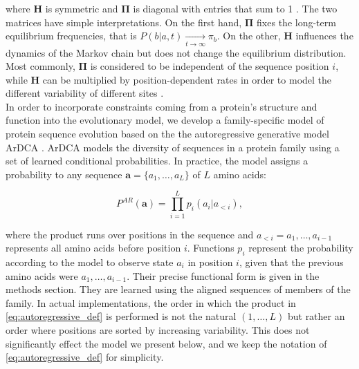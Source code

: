 where $\mathbf{H}$ is symmetric and $\mathbf{\Pi}$ is diagonal with entries that sum to 1 \cite{yang_computationalmolecularevolution_2006}. 
The two matrices have simple interpretations. 
On the first hand, $\mathbf{\Pi}$ fixes the long-term equilibrium frequencies, that is $P(b \vert a, t) \xrightarrow[t \rightarrow \infty]{} \pi_b$.
On the other, $\mathbf{H}$ influences the dynamics of the Markov chain but does not change the equilibrium distribution. 
Most commonly, $\mathbf{\Pi}$ is considered to be independent of the sequence position $i$, while $\mathbf{H}$ can be multiplied by position-dependent rates in order to model the different variability of different sites \cite{yang_maximumlikelihoodphylogenetic_1994,stamatakis_raxmlversiontool_2014,nguyen_iqtreefasteffective_2015}. \\


In order to incorporate constraints coming from a protein's structure and function into the evolutionary model, we develop a family-specific model of protein sequence evolution based on the the autoregressive generative model ArDCA \cite{trinquier_efficientgenerativemodeling_2021}. 
ArDCA models the diversity of sequences in a protein family using a set of learned conditional probabilities. 
In practice, the model assigns a probability to any sequence $\mathbf{a} = \{a_1, \ldots, a_L\}$ of $L$ amino acids: 

\begin{equation}
	\label{eq:autoregressive_def}
	P^{AR}(\mathbf{a}) = \prod_{i=1}^L p_i(a_i \vert a_{<i}),
\end{equation}

where the product runs over positions in the sequence and $a_{<i} = a_1, \ldots, a_{i-1}$ represents all amino acids before position $i$. 
Functions $p_i$ represent the probability according to the model to observe state $a_i$ in position $i$, given that the previous amino acids were $a_1, \ldots, a_{i-1}$. 
Their precise functional form is given in the methods section. 
They are learned using the aligned sequences of members of the family. 
In actual implementations, the order in which the product in \eqref{eq:autoregressive_def} is performed is not the natural $(1, \ldots, L)$ but rather an order where positions are sorted by increasing variability.
This does not significantly effect the model we present below, and we keep the notation of \eqref{eq:autoregressive_def} for simplicity. 


